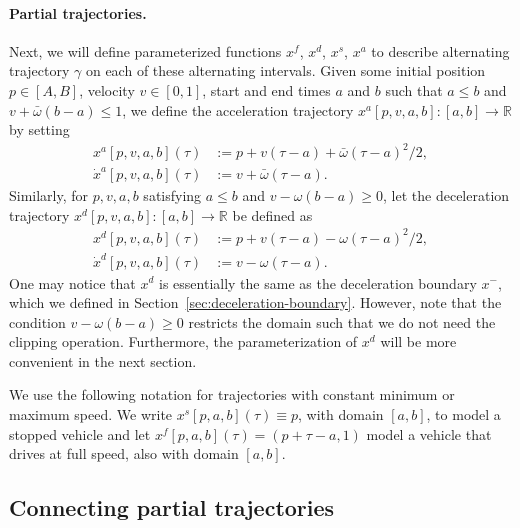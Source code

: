 \documentclass[a4paper]{article}
\theoremstyle{definition}
\theoremstyle{plain}
\begin{document}
\paragraph{Partial trajectories.}
Next, we will define parameterized functions $x^{f}$, $x^{d}$, $x^{s}$, $x^{a}$
to describe alternating trajectory $\gamma$ on each of these alternating intervals.
%
Given some initial position $p \in [A,B]$, velocity $v \in [0, 1]$, start and end times $a$ and
$b$ such that $a \leq b$ and $v + \bar{\omega}(b - a) \leq 1$, we define the acceleration
trajectory $x^{a}[p, v, a, b] : [a, b] \rightarrow \mathbb{R}$ by setting
\begin{subequations}
\begin{align}
  x^{a}[p,v,a,b](\tau) &:= p + v(\tau - a) + \bar{\omega} (\tau-a)^{2} / 2 , \\
  \dot{x}^{a}[p,v,a,b](\tau) &:= v + \bar{\omega} (\tau - a) .
\end{align}
\end{subequations}
%
Similarly, for $p, v, a, b$ satisfying $a \leq b$ and $v - \omega(b-a) \geq 0$,
let the deceleration trajectory
$x^{d}[p, v, a, b] : [a, b] \rightarrow \mathbb{R}$ be defined as
\begin{subequations}
\begin{align}
  x^{d}[p,v,a,b](\tau) &:= p + v (\tau - a) - \omega (\tau - a)^{2} / 2 , \\
  \dot{x}^{d}[p,v,a,b](\tau) &:= v - \omega (\tau - a) .
\end{align}
\end{subequations}
%
One may notice that $x^{d}$ is essentially the same as the deceleration boundary
$x^{-}$, which we defined in Section~\ref{sec:deceleration-boundary}. However, note that the condition $v - \omega(b-a) \geq 0$ restricts the domain such that we do not need the clipping operation. Furthermore, the parameterization of $x^{d}$ will be more convenient in the next section.

We use the following notation for trajectories with constant minimum or maximum
speed. We write $x^{s}[p, a, b](\tau) \equiv p$, with domain $[a,b]$, to model a stopped
vehicle and let $x^{f}[p, a, b](\tau) = (p + \tau - a, 1)$ model a vehicle that drives
at full speed, also with domain $[a,b]$.


\subsection{Connecting partial trajectories}
\end{document}

